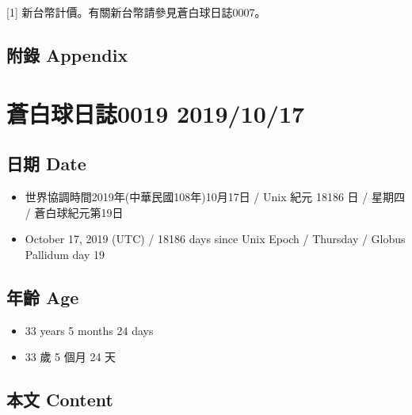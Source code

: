 \documentclass[a5paper, 12pt
]{book}
\providecommand{\tightlist}{%
  \setlength{\itemsep}{0pt}\setlength{\parskip}{0pt}}
\begin{document}
{[}1{]} 新台幣計價。有關新台幣請參見蒼白球日誌0007。

\hypertarget{ux9644ux9304-appendix-10}{%
\subsection{附錄 Appendix}\label{ux9644ux9304-appendix-10}}

\hypertarget{ux84bcux767dux7403ux65e5ux8a8c0019-20191017}{%
\section{蒼白球日誌0019
2019/10/17}\label{ux84bcux767dux7403ux65e5ux8a8c0019-20191017}}

\hypertarget{ux65e5ux671f-date-18}{%
\subsection{日期 Date}\label{ux65e5ux671f-date-18}}

\begin{itemize}
\tightlist
\item
  世界協調時間2019年(中華民國108年)10月17日 / Unix 紀元 18186 日 /
  星期四 / 蒼白球紀元第19日
\item
  October 17, 2019 (UTC) / 18186 days since Unix Epoch / Thursday /
  Globus Pallidum day 19
\end{itemize}

\hypertarget{ux5e74ux9f61-age-18}{%
\subsection{年齡 Age}\label{ux5e74ux9f61-age-18}}

\begin{itemize}
\tightlist
\item
  33 years 5 months 24 days
\item
  33 歲 5 個月 24 天
\end{itemize}

\hypertarget{ux672cux6587-content-18}{%
\subsection{本文 Content}\label{ux672cux6587-content-18}}
\end{document}
